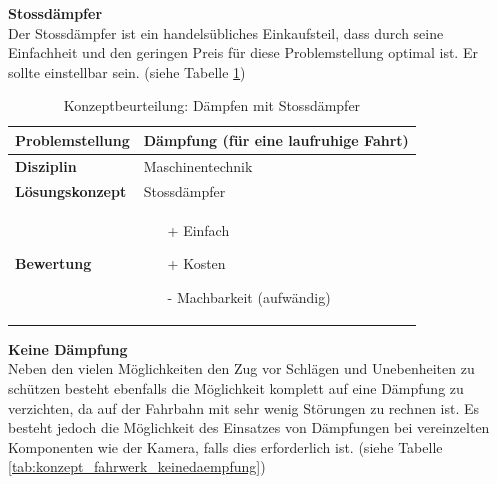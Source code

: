 \documentclass[../../main.tex]{subfiles}
\begin{document}
  \textbf{Stossdämpfer}\\
  Der Stossdämpfer ist ein handelsübliches Einkaufsteil, dass durch seine Einfachheit und den geringen Preis für diese Problemstellung optimal ist. Er sollte einstellbar sein. (siehe Tabelle \ref{tab:konzept_fahrwerk_stossdaempfer})

  \begin{flushleft}
    \begin{table}[h]
    \begin{tabular}{ | l | p{11cm} |}
    \hline
    \textbf{Problemstellung} & Dämpfung (für eine laufruhige Fahrt) \\ \hline
    \textbf{Disziplin} & Maschinentechnik \\ \hline
    \textbf{Lösungskonzept} & Stossdämpfer \\ \hline
    \textbf{Bewertung} &  \begin{itemize}
                            \item[+] Einfach
                            \item[+] Kosten
                            \item[-] Machbarkeit (aufwändig)
                          \end{itemize} \\ \hline
    \end{tabular}
    \caption{Konzeptbeurteilung: Dämpfen mit Stossdämpfer}
    \label{tab:konzept_fahrwerk_stossdaempfer}
\end{table}
\end{flushleft}

\textbf{Keine Dämpfung}\\
Neben den vielen Möglichkeiten den Zug vor Schlägen und Unebenheiten zu schützen besteht ebenfalls die Möglichkeit komplett auf eine Dämpfung zu verzichten, da auf der Fahrbahn mit sehr wenig Störungen zu rechnen ist. Es besteht jedoch die Möglichkeit des Einsatzes von Dämpfungen bei vereinzelten Komponenten wie der Kamera, falls dies erforderlich ist. (siehe Tabelle \ref{tab:konzept_fahrwerk_keinedaempfung})
\end{document}
